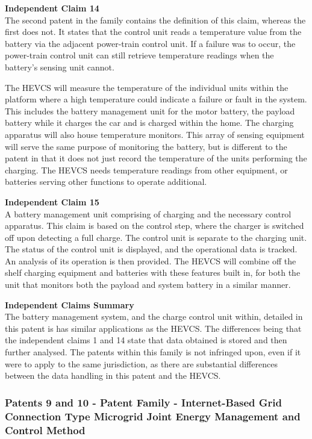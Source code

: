 \documentclass [12pt]{article}
\begin{document}
\textbf{Independent Claim 14}\\
The second patent in the family contains the definition of this claim, whereas the first does not. It states that the control unit reads a temperature value from the battery via the adjacent power-train control unit. If a failure was to occur, the power-train control unit can still retrieve temperature readings when the battery’s sensing unit cannot.

The HEVCS will measure the temperature of the individual units within the platform where a high temperature could indicate a failure or fault in the system. This includes the battery management unit for the motor battery, the payload battery while it charges the car and is charged within the home. The charging apparatus will also house temperature monitors. This array of sensing equipment will serve the same purpose of monitoring the battery, but is different to the patent in that it does not just record the temperature of the units performing the charging. The HEVCS needs temperature readings from other equipment, or batteries serving other functions to operate additional.

\textbf{Independent Claim 15}\\
A battery management unit comprising of charging and the necessary control apparatus. This claim is based on the control step, where the charger is switched off upon detecting a full charge. The control unit is separate to the charging unit. The status of the control unit is displayed, and the operational data is tracked. An analysis of its operation is then provided. The HEVCS will combine off the shelf charging equipment and batteries with these features built in, for both the unit that monitors both the payload and system battery in a similar manner.

\textbf{Independent Claims Summary}\\
The battery management system, and the charge control unit within, detailed in this patent is has similar applications as the HEVCS. The differences being that the independent claims 1 and 14 state that data obtained is stored and then further analysed. The patents within this family is not infringed upon, even if it were to apply to the same jurisdiction, as there are substantial differences between the data handling in this patent and the HEVCS.

\subsubsection{Patents 9 and 10 - Patent Family - Internet-Based Grid Connection Type Microgrid Joint Energy Management and Control Method}
\end{document}
